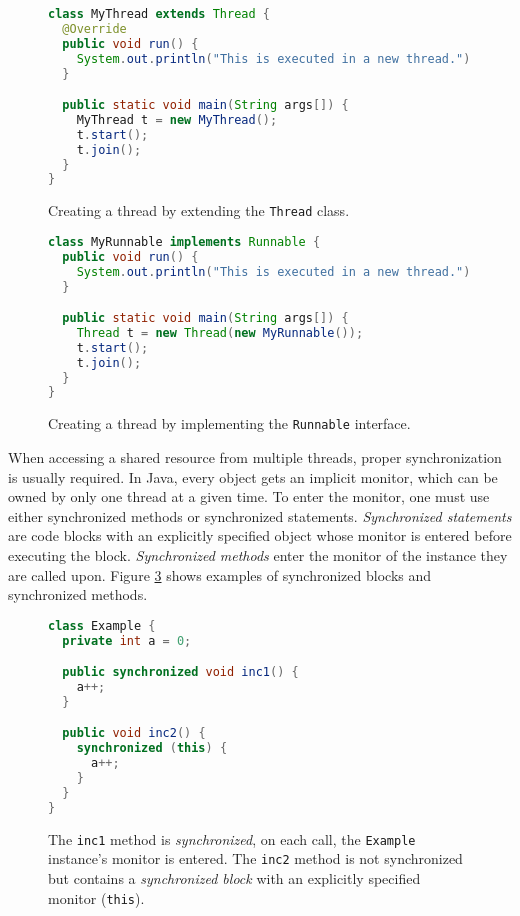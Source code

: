 \begin{figure}[hbt]
    \label{threadExtend}
\begin{lstlisting}[language=java]
class MyThread extends Thread {
  @Override
  public void run() {
    System.out.println("This is executed in a new thread.");
  }

  public static void main(String args[]) {
    MyThread t = new MyThread();
    t.start();
    t.join();
  }
}
\end{lstlisting}
    \caption{Creating a thread by extending the \texttt{Thread} class.}
\end{figure}

\begin{figure}[hbt]
    \label{threadRunnable}
\begin{lstlisting}[language=java]
class MyRunnable implements Runnable {
  public void run() {
    System.out.println("This is executed in a new thread.");
  }

  public static void main(String args[]) {
    Thread t = new Thread(new MyRunnable());
    t.start();
    t.join();
  }
}
\end{lstlisting}
    \caption{Creating a thread by implementing the \texttt{Runnable} interface.}
\end{figure}

When accessing a shared resource from multiple threads, proper synchronization
is usually required. In Java, every object gets an implicit monitor, which can
be owned by only one thread at a given time. To enter the monitor, one must use
either synchronized methods or synchronized statements.  \emph{Synchronized
statements} are code blocks with an explicitly specified object whose monitor is
entered before executing the block. \emph{Synchronized methods} enter the
monitor of the instance they are called upon. Figure \ref{synchronized} shows
examples of synchronized blocks and synchronized methods.

\begin{figure}[hbt]
    \label{synchronized}
\begin{lstlisting}[language=java]
class Example {
  private int a = 0;

  public synchronized void inc1() {
    a++;
  }

  public void inc2() {
    synchronized (this) {
      a++;
    }
  }
}
\end{lstlisting}
    \caption{The \texttt{inc1} method is \emph{synchronized}, on each call, the
    \texttt{Example} instance's monitor is entered. The \texttt{inc2} method is
    not synchronized but contains a \emph{synchronized block} with an explicitly
    specified monitor (\texttt{this}).}
\end{figure}

